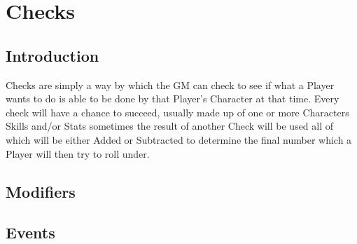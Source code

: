 
\chapter{Checks}

\section{Introduction}
\Glspl{Check} are simply a way by which the \gls{GM} can check to see
if what a Player wants to do is able to be done by that Player's
\Gls{Character} at that time. Every check will have a chance to
succeed, usually made up of one or more \glspl{Character} \glspl{Skill}
and/or \glspl{Stat} sometimes the result of another \gls{Check} will
be used all of which will be either Added or Subtracted to determine
the final number which a Player will then try to roll under.

\section{Modifiers}


\section{Events}

